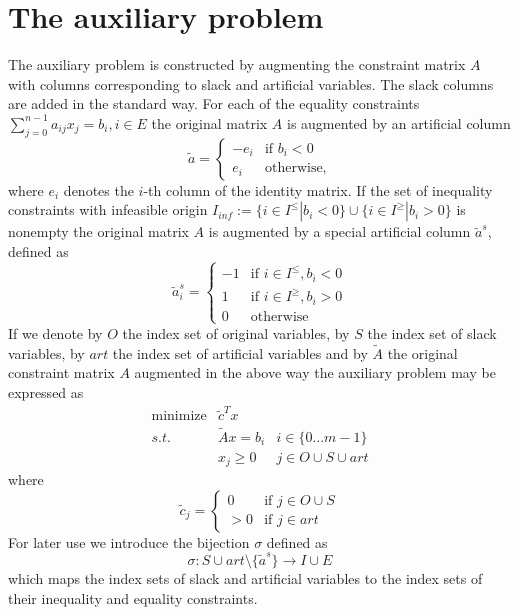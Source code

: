 \documentclass[a4paper]{article}
\begin{document}
\section{The auxiliary problem}
The auxiliary problem is constructed by augmenting the constraint matrix $A$
with columns corresponding to slack and artificial variables. The slack columns
are added in the standard way. For each of the equality constraints 
$\sum_{j=0}^{n-1} {a_{i j}x_{j}} = b_{i}, i \in E$ the original matrix $A$
is augmented by an artificial column
\begin{equation} \label{def:art_col}
 \tilde{a} =  \left\{
	        \begin{array}{ll}
  		  -e_{i} & \mbox{if $b_{i} < 0$} \\
		   e_{i}  & \mbox{otherwise,}
	        \end{array}
 	       \right.
\end{equation}
where $e_{i}$ denotes the $i$-th column of the identity matrix.
If the set of inequality constraints with infeasible origin
$I_{inf}:=\{i \in I^{\leq} \left| \right. b_{i} < 0 \} \cup 
  \{i \in I^{\geq} \left| \right. b_{i} > 0 \}$
 is nonempty the original matrix $A$
is augmented by a special artificial column $\tilde{a}^{s}$, defined as 
\begin{equation}\label{def:spec_art_col}
  \tilde{a}^{s}_{i} =  \left\{
	                 \begin{array}{ll}
  		           -1 & \mbox{if $i \in I^{\leq}, b_{i} < 0$} \\
		            1 & \mbox{if $i \in I^{\geq}, b_{i} > 0$} \\
		            0 & \mbox{otherwise}
	                 \end{array}
 	               \right.
\end{equation}
If we denote by $O$ the index set of original variables, by $S$ the index set
of slack variables, by $art$ the index set of artificial variables and by
$\tilde{A}$ the original constraint matrix $A$ augmented in the above way
the auxiliary problem may be expressed as
\begin{eqnarray*}
 \mbox{minimize} &  \tilde{c}^{T}x      & 	  \\
	s.t.	 & \tilde{A}x = b_{i}	& i \in \{0 \ldots m-1 \}      \\
		 & x_{j} \geq 0	  	& j \in O \cup S \cup art  
\end{eqnarray*}
where
\begin{equation} \label{def:aux_c}
 \tilde{c}_{j} =  \left\{
	            \begin{array}{ll}
  		      0      & \mbox{if $j \in O \cup S$} \\
		      > 0 & \mbox{if $j \in art$}
	            \end{array}
 	          \right.
\end{equation}
For later use we introduce the bijection $\sigma$ defined as
\begin{equation}
\sigma: S \cup art \setminus \{\tilde{a}^{s}\} \rightarrow I \cup E
\end{equation}
which maps the index sets of slack and artificial variables to
the index sets of their inequality and equality constraints. 
\end{document}
